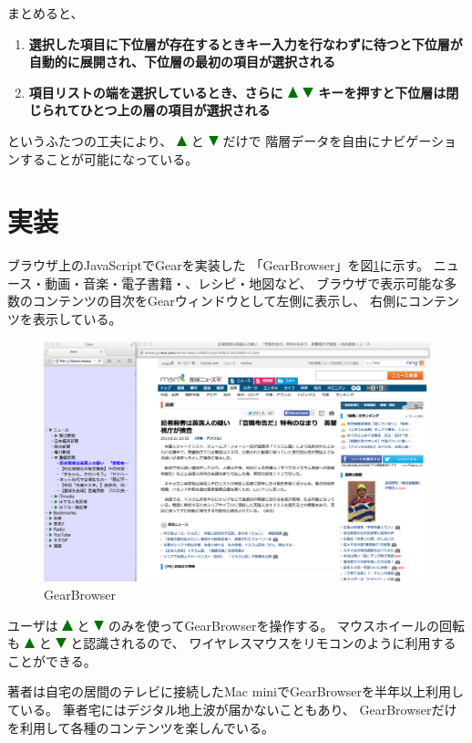 \documentclass[twoside]{wiss}
\def\GEAR{\textsf{Gear}}
\def\GB{\textsf{GearBrowser}}
\def\up{ \includegraphics[width=3mm,bb=0 0 36 36]{figures/uptriangle.pdf} }
\def\down{ \includegraphics[width=3mm,bb=0 0 36 36]{figures/downtriangle.pdf} }
\begin{document}
まとめると、

\begin{enumerate}
\item \textbf{選択した項目に下位層が存在するときキー入力を行なわずに待つと下位層が自動的に展開され、下位層の最初の項目が選択される}
\item \textbf{項目リストの端を選択しているとき、さらに{\up}{\down}キーを押すと下位層は閉じられてひとつ上の層の項目が選択される}
\end{enumerate}

\noindent
というふたつの工夫により、
{\up}と{\down}だけで
階層データを自由にナビゲーションすることが可能になっている。

\section{実装}

ブラウザ上のJavaScriptで{\GEAR}を実装した
「{\GB}」を図\ref{gearbrowser}に示す。
ニュース・動画・音楽・電子書籍・、レシピ・地図など、
ブラウザで表示可能な多数のコンテンツの目次を{\GEAR}ウィンドウとして左側に表示し、
右側にコンテンツを表示している。

\begin{figure}
\centerline{\includegraphics[width=160mm,bb=0 0 1401 872]{figures/ab4ff7c2d44f4af2bb94fae76589f495.png}}
\caption{\textsf{GearBrowser}}
\label{gearbrowser}
\end{figure}

ユーザは{\up}と{\down}のみを使って{\GB}を操作する。
マウスホイールの回転も{\up}と{\down}と認識されるので、
ワイヤレスマウスをリモコンのように利用することができる。

著者は自宅の居間のテレビに接続したMac miniで{\GB}を半年以上利用している。
筆者宅にはデジタル地上波が届かないこともあり、
{\GB}だけを利用して各種のコンテンツを楽しんでいる。
\end{document}
